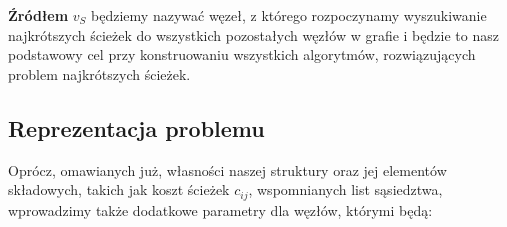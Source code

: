 \begin{myitemize}
\item \textbf{Źródłem} $v_{S}$ będziemy nazywać węzeł, z którego rozpoczynamy wyszukiwanie najkrótszych ścieżek do wszystkich pozostałych węzłów w grafie i będzie to nasz podstawowy cel przy konstruowaniu wszystkich algorytmów, rozwiązujących problem najkrótszych ścieżek.

\end{myitemize}

\subsection{Reprezentacja problemu}

Oprócz, omawianych już, własności naszej struktury oraz jej elementów składowych, takich jak koszt ścieżek $c_{ij}$, wspomnianych list sąsiedztwa, wprowadzimy także dodatkowe parametry dla węzłów, którymi będą:

